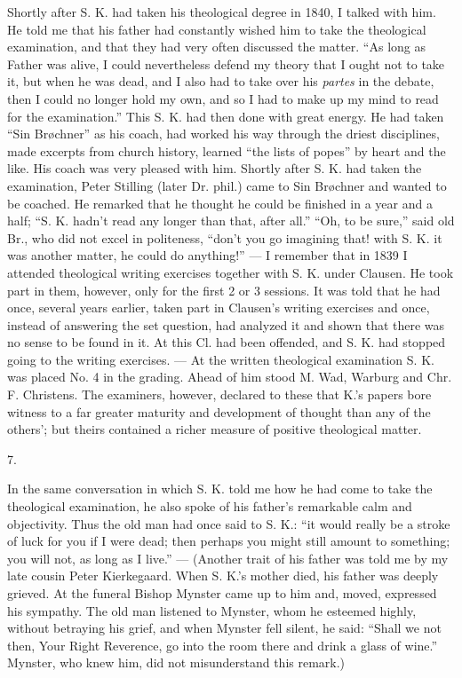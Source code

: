 \documentclass[12pt,a4paper,openany]{book}
\newcommand{\secnum}[1]{\par\begin{center}#1\end{center}\par\nobreak}
\newcommand{\opage}[1]{\marginnote{\footnotesize\textit{[#1]}}}
\begin{document}
Shortly after S. K. had taken his theological degree
in 1840, I talked with him. He told me that
his father had constantly wished him to take the
theological examination, and that they had very often discussed
the matter. ``As long as Father was alive, I could
nevertheless defend my theory that I ought not to take
it, but when he was dead, and I also had to take over
his \textit{partes} in the debate, then I could no longer hold
my own, and so I had to make up my mind to read for the examination.''
This S. K. had then done with great energy. He had
taken ``Sin Brøchner'' as his coach, had worked his way
through the driest disciplines, made excerpts from church history,
learned ``the lists of popes'' by heart and the like. His coach
was very pleased with him. Shortly after S. K.
had taken the examination, Peter Stilling (later Dr. phil.)
came to Sin Brøchner and wanted to be coached. He remarked that
he thought he could be finished in a year and a half;
``S. K. hadn't read any longer than that, after all.'' ``Oh, to be sure,'' said
old Br., who did not excel in politeness, ``don't you go
imagining that! with S. K. it was another matter, he
could do anything!'' --- I remember that in 1839 I attended
theological writing exercises together with S. K. under Clausen.
He took part in them, however, only for the first 2 or 3 sessions.
It was told that he had once, several years earlier,
taken part in Clausen's writing exercises and once, instead of
\opage{342}answering the set question, had analyzed it and shown that
there was no sense to be found in it. At this Cl. had been
offended, and S. K. had stopped going to the writing exercises.
--- At the written theological examination S. K. was placed No.
4 in the grading. Ahead of him stood M. Wad, Warburg
and Chr. F. Christens. The examiners, however, declared
to these that K.'s papers bore witness to a far greater
maturity and development of thought than any of the others';
but theirs contained a richer measure of positive theological matter.

\secnum{7.}

In the same conversation in which S. K. told me
how he had come to take the theological examination,
he also spoke of his father's remarkable calm and objectivity.
Thus the old man had once said to S. K.:
``it would really be a stroke of luck for you if I were dead;
then perhaps you might still amount to something; you will
not, as long as I live.'' --- (Another trait of his
father was told me by my late cousin Peter Kierkegaard.
When S. K.'s mother died, his father was deeply
grieved. At the funeral Bishop Mynster came up
to him and, moved, expressed his sympathy. The old man
listened to Mynster, whom he esteemed highly, without betraying his grief,
and when Mynster fell silent, he said: ``Shall we
not then, Your Right Reverence, go into the room there
and drink a glass of wine.'' Mynster, who knew him, did not
misunderstand this remark.)
\end{document}
